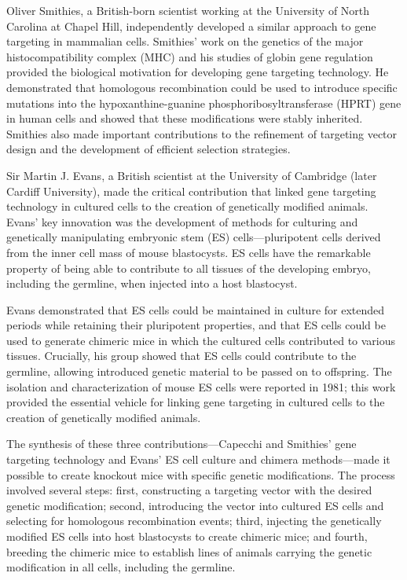 Oliver Smithies, a British-born scientist working at the University of North Carolina at Chapel Hill, independently developed a similar approach to gene targeting in mammalian cells. Smithies' work on the genetics of the major histocompatibility complex (MHC) and his studies of globin gene regulation provided the biological motivation for developing gene targeting technology. He demonstrated that homologous recombination could be used to introduce specific mutations into the hypoxanthine-guanine phosphoribosyltransferase (HPRT) gene in human cells and showed that these modifications were stably inherited. Smithies also made important contributions to the refinement of targeting vector design and the development of efficient selection strategies.

Sir Martin J. Evans, a British scientist at the University of Cambridge (later Cardiff University), made the critical contribution that linked gene targeting technology in cultured cells to the creation of genetically modified animals. Evans' key innovation was the development of methods for culturing and genetically manipulating embryonic stem (ES) cells---pluripotent cells derived from the inner cell mass of mouse blastocysts. ES cells have the remarkable property of being able to contribute to all tissues of the developing embryo, including the germline, when injected into a host blastocyst.

Evans demonstrated that ES cells could be maintained in culture for extended periods while retaining their pluripotent properties, and that ES cells could be used to generate chimeric mice in which the cultured cells contributed to various tissues. Crucially, his group showed that ES cells could contribute to the germline, allowing introduced genetic material to be passed on to offspring. The isolation and characterization of mouse ES cells were reported in 1981; this work provided the essential vehicle for linking gene targeting in cultured cells to the creation of genetically modified animals.

The synthesis of these three contributions---Capecchi and Smithies' gene targeting technology and Evans' ES cell culture and chimera methods---made it possible to create knockout mice with specific genetic modifications. The process involved several steps: first, constructing a targeting vector with the desired genetic modification; second, introducing the vector into cultured ES cells and selecting for homologous recombination events; third, injecting the genetically modified ES cells into host blastocysts to create chimeric mice; and fourth, breeding the chimeric mice to establish lines of animals carrying the genetic modification in all cells, including the germline.

